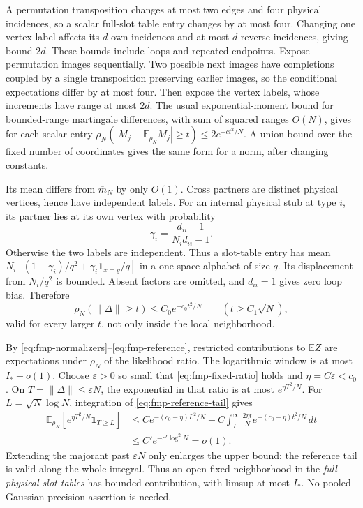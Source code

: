 A permutation transposition changes at most two edges and four
physical incidences, so a scalar full-slot table entry changes by
at most four. Changing one vertex label affects its $d$ own
incidences and at most $d$ reverse incidences, giving bound $2d$.
These bounds include loops and repeated endpoints. Expose permutation
images sequentially. Two possible next images have completions coupled
by a single transposition preserving earlier images, so the conditional
expectations differ by at most four. Then expose the vertex labels,
whose increments have range at most $2d$. The usual exponential-moment
bound for bounded-range martingale differences, with sum of squared
ranges $O(N)$, gives for each scalar entry
$\rho_N(|M_j-\mathbb E_{\rho_N}M_j|\ge t)\le2e^{-ct^2/N}$.
A union bound over the fixed number of coordinates gives the same
form for a norm, after changing constants.

Its mean differs from $\overline m_N$ by only $O(1)$. Cross partners
are distinct physical vertices, hence have independent labels. For
an internal physical stub at type $i$, its partner lies at its own
vertex with probability
\[
 \gamma_i=\frac{d_{ii}-1}{N_id_{ii}-1}.
\]
Otherwise the two labels are independent. Thus a slot-table entry
has mean $N_i[(1-\gamma_i)/q^2+
\gamma_i\mathbf1_{x=y}/q]$ in a one-space alphabet of size $q$.
Its displacement from $N_i/q^2$ is bounded. Absent factors are omitted,
and $d_{ii}=1$ gives zero loop bias. Therefore
\begin{equation}\label{eq:fmp-reference-tail}
 \rho_N(\|\Delta\|\ge t)\le C_0e^{-c_0t^2/N}
                  \qquad(t\ge C_1\sqrt N),
\end{equation}
valid for every larger $t$, not only inside the local neighborhood.

By \eqref{eq:fmp-normalizers}--\eqref{eq:fmp-reference}, restricted
contributions to $\mathbb E Z$ are expectations under $\rho_N$ of
the likelihood ratio. The logarithmic window is at most $I_*+o(1)$.
Choose $\varepsilon>0$ so small that \eqref{eq:fmp-fixed-ratio}
holds and $\eta=C\varepsilon<c_0$. On $T=\|\Delta\|\le\varepsilon N$,
the exponential in that ratio is at most $e^{\eta T^2/N}$. For
$L=\sqrt N\log N$, integration of \eqref{eq:fmp-reference-tail} gives
\begin{align*}
 \mathbb E_{\rho_N}[e^{\eta T^2/N}\mathbf1_{T\ge L}]
 &\le C e^{-(c_0-\eta)L^2/N}
   +C\int_L^\infty\frac{2\eta t}{N}e^{-(c_0-\eta)t^2/N}\,dt\\
 &\le C'e^{-c'\log^2N}=o(1).
\end{align*}
Extending the majorant past $\varepsilon N$ only enlarges the upper
bound; the reference tail is valid along the whole integral. Thus an
open fixed neighborhood in the \emph{full physical-slot tables} has
bounded contribution, with limsup at most $I_*$. No pooled Gaussian
precision assertion is needed.


